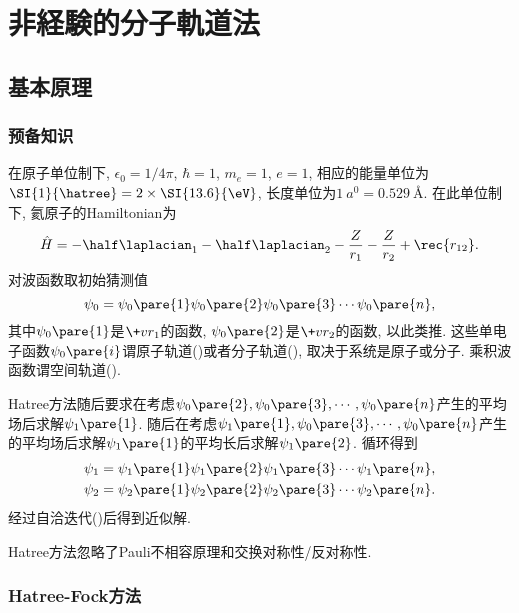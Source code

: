 \documentclass[hidelinks]{ctexart}
\begin{document}
\section{非経験的分子軌道法} %
\label{sec:非経験的分子軌道法}

\subsection{基本原理} %
\label{sub:基本原理}

\subsubsection{预备知识} %
\label{ssub:预备知识}

在原子单位制下, $\epsilon_0 = 1/4\pi$, $\hbar = 1$, $m_e = 1$, $e=1$, 相应的能量单位为$\SI{1}{\hatree} = 2\times \SI{13.6}{\eV}$, 长度单位为$\SI{1}{\bohr} = \SI{0.529}{\angstrom}$. 在此单位制下, 氦原子的Hamiltonian为
\[ \hat H = -\half \laplacian_1 - \half \laplacian_2 - \frac{Z}{r_1} - \frac{Z}{r_2} + \rec{r_{12}}. \]
对波函数取初始猜测值
\[ \psi_0 = \psi_0\pare{1}\psi_0\pare{2}\psi_0\pare{3}\cdots \psi_0\pare{n}, \]
其中$\psi_0\pare{1}$是$\+vr_1$的函数, $\psi_0\pare{2}$是$\+vr_2$的函数, 以此类推. 这些单电子函数$\psi_0\pare{i}$谓原子轨道()或者分子轨道(), 取决于系统是原子或分子. 乘积波函数谓空间轨道().
\par
Hatree方法随后要求在考虑$\psi_0\pare{2},\psi_0\pare{3},\cdots,\psi_0\pare{n}$产生的平均场后求解$\psi_1\pare{1}$. 随后在考虑$\psi_1\pare{1},\psi_0\pare{3},\cdots,\psi_0\pare{n}$产生的平均场后求解$\psi_1\pare{1}$的平均长后求解$\psi_1\pare{2}$. 循环得到
\begin{align*}
    \psi_1 &= \psi_1\pare{1} \psi_1\pare{2} \psi_1\pare{3} \cdots \psi_1\pare{n}, \\
    \psi_2 &= \psi_2\pare{1} \psi_2\pare{2} \psi_2\pare{3} \cdots \psi_2\pare{n}.
\end{align*}
经过自洽迭代()后得到近似解.
\begin{remark}
    Hatree方法忽略了Pauli不相容原理和交换对称性/反对称性.
\end{remark}


\subsubsection{Hatree-Fock方法} %
\label{ssub:hatree_fock方法}
\end{document}
